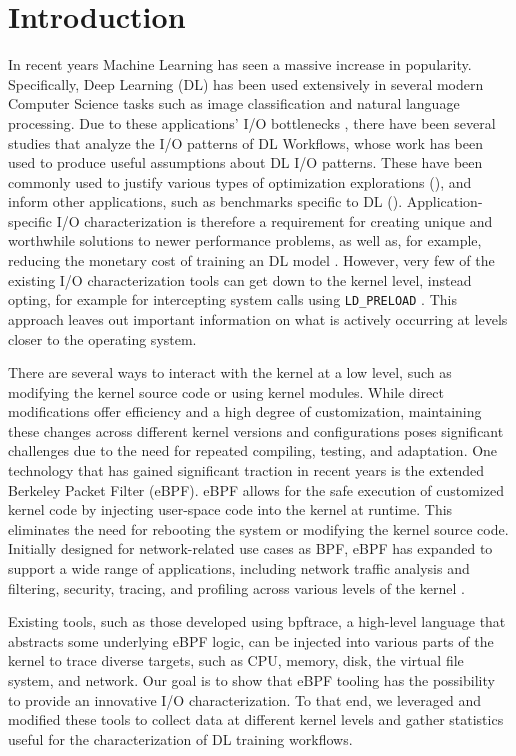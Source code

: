 \documentclass[conference]{IEEEtran}
\begin{document}
\section{Introduction}
In recent years Machine Learning has seen a massive increase in popularity.
Specifically, Deep Learning (DL) has been used extensively in several modern Computer Science tasks such as image classification
and natural language processing.
Due to these applications' I/O bottlenecks \cite{beegfsDL}, there have been several studies that analyze the I/O patterns of DL Workflows, whose work
has been used to produce useful assumptions about DL I/O patterns. These have been commonly used to
justify various types of optimization explorations (\cite{LMDB, nvme, beegfsDL, bamboo}), and inform
other applications, such as benchmarks specific to DL (\cite{TFbenchmark, OanaDL}).
Application-specific I/O characterization is therefore a requirement for creating
unique and worthwhile solutions to
newer performance problems, as well as, for example, reducing the monetary cost of training an
DL model \cite{bamboo}. However, very few of the existing I/O characterization tools
can get down to the kernel level, instead opting, for example for intercepting system calls using \texttt{LD\_PRELOAD} \cite{HPCIODarshan}. This approach leaves out important information on what is actively occurring at levels closer to the operating system.

There are several ways to interact with the kernel at a low level, such as modifying the kernel source code or using kernel modules. While direct modifications offer efficiency and a high degree of customization, maintaining these changes across different kernel versions and configurations poses significant challenges due to the need for repeated compiling, testing, and adaptation. One technology that has gained significant traction in recent years is the extended Berkeley Packet Filter (eBPF).
eBPF allows for the safe execution of customized kernel code by injecting user-space code into the kernel at runtime.
This eliminates the need for rebooting the system or modifying the kernel source code.
Initially designed for network-related use cases as BPF, eBPF has expanded to support a wide range of applications, including network traffic analysis and filtering, security, tracing, and profiling across various levels of the kernel \cite{eBPFSurvey2}.

Existing tools, such as those developed using bpftrace, a high-level language that abstracts some underlying eBPF logic, can be injected into various parts of the kernel to trace diverse targets,
such as CPU, memory, disk, the virtual file system, and network.
Our goal is to show that eBPF tooling has the possibility to provide an innovative I/O characterization. To that end, we leveraged and modified these tools to collect data at different kernel levels and gather statistics useful for the characterization of DL training workflows.
\end{document}
